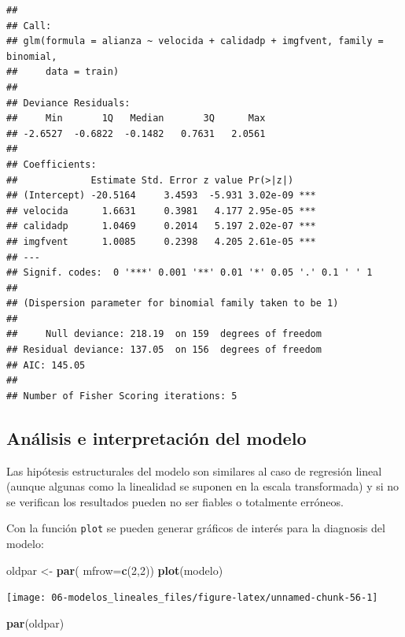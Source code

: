 \documentclass[
]{book}
\newenvironment{Shaded}{\begin{snugshade}}{\end{snugshade}}
\newcommand{\DataTypeTok}[1]{\textcolor[rgb]{0.13,0.29,0.53}{#1}}
\newcommand{\DecValTok}[1]{\textcolor[rgb]{0.00,0.00,0.81}{#1}}
\newcommand{\KeywordTok}[1]{\textcolor[rgb]{0.13,0.29,0.53}{\textbf{#1}}}
\newcommand{\NormalTok}[1]{#1}
\newcommand{\StringTok}[1]{\textcolor[rgb]{0.31,0.60,0.02}{#1}}
\theoremstyle{break}
\theoremstyle{definition}
\theoremstyle{definition}
\theoremstyle{definition}
\theoremstyle{remark}
\begin{document}
\begin{verbatim}
## 
## Call:
## glm(formula = alianza ~ velocida + calidadp + imgfvent, family = binomial, 
##     data = train)
## 
## Deviance Residuals: 
##     Min       1Q   Median       3Q      Max  
## -2.6527  -0.6822  -0.1482   0.7631   2.0561  
## 
## Coefficients:
##             Estimate Std. Error z value Pr(>|z|)    
## (Intercept) -20.5164     3.4593  -5.931 3.02e-09 ***
## velocida      1.6631     0.3981   4.177 2.95e-05 ***
## calidadp      1.0469     0.2014   5.197 2.02e-07 ***
## imgfvent      1.0085     0.2398   4.205 2.61e-05 ***
## ---
## Signif. codes:  0 '***' 0.001 '**' 0.01 '*' 0.05 '.' 0.1 ' ' 1
## 
## (Dispersion parameter for binomial family taken to be 1)
## 
##     Null deviance: 218.19  on 159  degrees of freedom
## Residual deviance: 137.05  on 156  degrees of freedom
## AIC: 145.05
## 
## Number of Fisher Scoring iterations: 5
\end{verbatim}

\hypertarget{analisis-glm}{%
\subsection{Análisis e interpretación del modelo}\label{analisis-glm}}

Las hipótesis estructurales del modelo son similares al caso de regresión lineal (aunque algunas como la linealidad se suponen en la escala transformada) y si no se verifican los resultados pueden no ser fiables o totalmente erróneos.

Con la función \texttt{plot} se pueden generar gráficos de interés para la diagnosis del modelo:

\begin{Shaded}
\begin{Highlighting}[]
\NormalTok{oldpar <-}\StringTok{ }\KeywordTok{par}\NormalTok{( }\DataTypeTok{mfrow=}\KeywordTok{c}\NormalTok{(}\DecValTok{2}\NormalTok{,}\DecValTok{2}\NormalTok{))}
\KeywordTok{plot}\NormalTok{(modelo)}
\end{Highlighting}
\end{Shaded}

\begin{center}\texttt{[image: 06-modelos\_lineales\_files/figure-latex/unnamed-chunk-56-1]} \end{center}

\begin{Shaded}
\begin{Highlighting}[]
\KeywordTok{par}\NormalTok{(oldpar)}
\end{Highlighting}
\end{Shaded}
\end{document}
